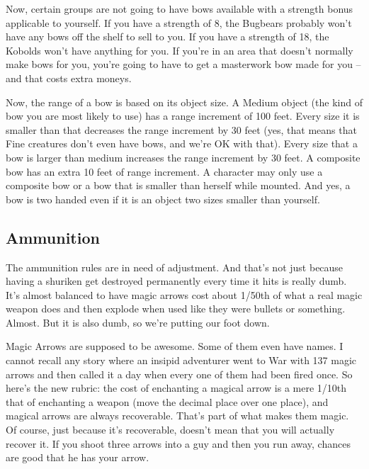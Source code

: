 Now, certain groups are not going to have bows available with a strength bonus applicable to yourself. If you have a strength of 8, the Bugbears probably won't have any bows off the shelf to sell to you. If you have a strength of 18, the Kobolds won't have anything for you. If you're in an area that doesn't normally make bows for you, you're going to have to get a masterwork bow made for you -- and that costs extra moneys.

Now, the range of a bow is based on its object size. A Medium object (the kind of bow you are most likely to use) has a range increment of 100 feet. Every size it is smaller than that decreases the range increment by 30 feet (yes, that means that Fine creatures don't even have bows, and we're OK with that). Every size that a bow is larger than medium increases the range increment by 30 feet. A composite bow has an extra 10 feet of range increment. A character may only use a composite bow or a bow that is smaller than herself while mounted. And yes, a bow is two handed even if it is an object two sizes smaller than yourself.

\subsection{Ammunition}
\vspace*{-8pt}

The ammunition rules are in need of adjustment. And that's not just because having a shuriken get destroyed permanently every time it hits is really dumb. It's almost balanced to have magic arrows cost about 1/50th of what a real magic weapon does and then explode when used like they were bullets or something. Almost. But it is also dumb, so we're putting our foot down.

Magic Arrows are supposed to be awesome. Some of them even have names. I cannot recall any story where an insipid adventurer went to War with 137 magic arrows and then called it a day when every one of them had been fired once. So here's the new rubric: the cost of enchanting a magical arrow is a mere 1/10th that of enchanting a weapon (move the decimal place over one place), and magical arrows are always recoverable. That's part of what makes them magic. Of course, just because it's recoverable, doesn't mean that you will actually recover it. If you shoot three arrows into a guy and then you run away, chances are good that he has your arrow.

